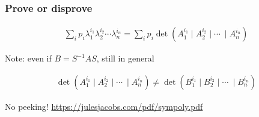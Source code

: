 \documentclass[aspectratio=169,xcolor={usenames,dvipsnames}]{beamer}
\newcommand{\R}{\mathbb{R}}
\newcommand{\m}{\!\!\mid\!}
\begin{document}
\begin{frame}\frametitle{Prove or disprove}
  \begin{align*}
    \sum_i p_i \lambda_1^{i_1} \lambda_2^{i_2} \cdots \lambda_n^{i_n} = \sum_i p_i \det(A_1^{i_1} \m A_2^{i_2} \m \cdots\ \m A_n^{i_n})
  \end{align*}
  \vspace{1cm}

  Note: even if $B = S^{-1}AS$, still in general

  \begin{align*}
    \det(A_1^{i_1} \m A_2^{i_2} \m \cdots\ \m A_n^{i_n}) \neq \det(B_1^{i_1} \m B_2^{i_2} \m \cdots\ \m B_n^{i_n})
  \end{align*}

  \vspace{2cm}

  No peeking! \tiny{\url{https://julesjacobs.com/pdf/sympoly.pdf}}
\end{frame}



\end{document}
